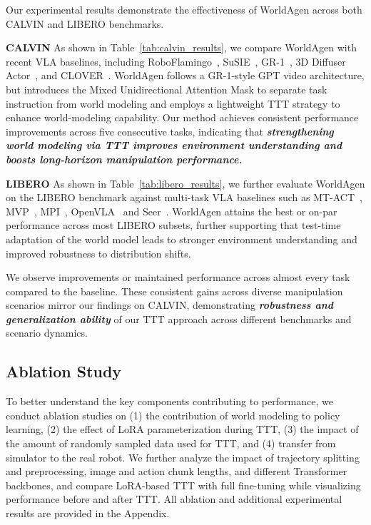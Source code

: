 Our experimental results demonstrate the effectiveness of WorldAgen across both CALVIN and LIBERO benchmarks. 

\noindent \textbf{CALVIN} As shown in Table~\ref{tab:calvin_results}, we compare WorldAgen with recent VLA baselines, including RoboFlamingo~\cite{li2023vision}, SuSIE~\cite{black2023zero}, GR-1~\cite{wu2023unleashing}, 3D Diffuser Actor~\cite{ke20243d}, and CLOVER~\cite{bu2024closed}.  WorldAgen follows a GR-1-style GPT video architecture, but introduces the Mixed Unidirectional Attention Mask to separate task instruction from world modeling and employs a lightweight TTT strategy to enhance world-modeling capability. Our method achieves consistent performance improvements across five consecutive tasks, indicating that \textbf{\textit{strengthening world modeling via TTT improves environment understanding and boosts long-horizon manipulation performance.}}

\noindent \textbf{LIBERO} As shown in Table~\ref{tab:libero_results}, we further evaluate WorldAgen on the LIBERO benchmark against multi-task VLA baselines such as MT-ACT~\cite{bharadhwaj2024roboagent}, MVP~\cite{xiao2022masked}, MPI~\cite{zeng2024learning}, OpenVLA~\cite{kim2024openvlaopensourcevisionlanguageactionmodel} and Seer~\cite{tian2024predictiveinversedynamicsmodels}. WorldAgen attains the best or on-par performance across most LIBERO subsets, further supporting that test-time adaptation of the world model leads to stronger environment understanding and improved robustness to distribution shifts.

We observe improvements or maintained performance across almost every task compared to the baseline. These consistent gains across diverse manipulation scenarios mirror our findings on CALVIN, demonstrating \textbf{\textit{robustness and generalization ability}} of our TTT approach across different benchmarks and scenario dynamics.

\subsection{Ablation Study}
\label{sec:ablation}

To better understand the key components contributing to performance, we conduct ablation studies on (1) the contribution of world modeling to policy learning, (2) the effect of LoRA parameterization during TTT, (3) the impact of the amount of randomly sampled data used for TTT, and (4) transfer from simulator to the real robot. We further analyze the impact of trajectory splitting and preprocessing, image and action chunk lengths, and different Transformer backbones, and compare LoRA-based TTT with full fine-tuning while visualizing performance before and after TTT. All ablation and additional experimental results are provided in the Appendix.


